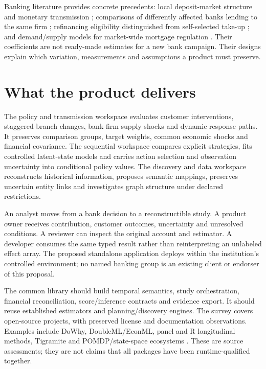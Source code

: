 \documentclass[11pt,a4paper,openany]{book}
\begin{document}
Banking literature provides concrete precedents: local deposit-market
structure and monetary transmission \citep{drechsler2017}; comparisons of
differently affected banks lending to the same firm \citep{mian2006};
refinancing eligibility distinguished from self-selected take-up
\citep{agarwal2020}; and demand/supply models for market-wide mortgage
regulation \citep{benetton2021}. Their coefficients are not ready-made
estimates for a new bank campaign. Their designs explain which variation,
measurements and assumptions a product must preserve.

\section*{What the product delivers}
The policy and transmission workspace evaluates customer interventions,
staggered branch changes, bank-firm supply shocks and dynamic response paths.
It preserves comparison groups, target weights, common economic shocks and
financial covariance. The sequential workspace compares explicit strategies,
fits controlled latent-state models and carries action selection and
observation uncertainty into conditional policy values. The discovery and
data workspace reconstructs historical information, proposes semantic
mappings, preserves uncertain entity links and investigates graph structure
under declared restrictions.

An analyst moves from a bank decision to a reconstructible study. A product
owner receives contribution, customer outcomes, uncertainty and unresolved
conditions. A reviewer can inspect the original account and estimator. A
developer consumes the same typed result rather than reinterpreting an
unlabeled effect array. The proposed standalone application deploys within
the institution's controlled environment; no named banking group is an
existing client or endorser of this proposal.

The common library should build temporal semantics, study orchestration,
financial reconciliation, score/inference contracts and evidence export.
It should reuse established estimators and planning/discovery engines.
The survey covers \SoftwareCount{} open-source projects, with preserved
license and documentation observations. Examples include DoWhy,
DoubleML/EconML, panel and R longitudinal methods, Tigramite and POMDP/state-space
ecosystems \citep{sw_dowhy,sw_doubleml,sw_econml,sw_did,sw_lmtp,
sw_tigramite,sw_dynamax,sw_pomdps}.
These are source assessments; they are not claims that all packages have
been runtime-qualified together.
\end{document}
